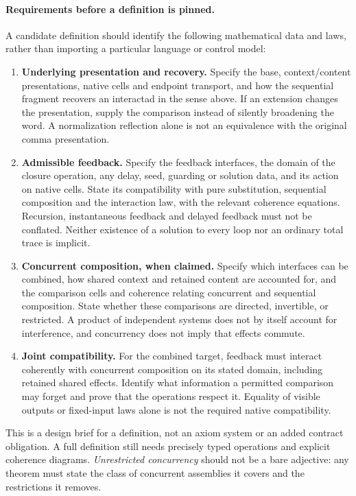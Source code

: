 \documentclass[11pt]{article}
\begin{document}
\paragraph{Requirements before a definition is pinned.}
A candidate definition should identify the following mathematical data
and laws, rather than importing a particular language or control model:
\begin{enumerate}
\item \textbf{Underlying presentation and recovery.} Specify the base,
context/content presentations, native cells and endpoint transport, and
how the sequential fragment recovers an interactad in the sense above.
If an extension changes the presentation, supply the comparison instead
of silently broadening the word. A normalization reflection alone is not
an equivalence with the original comma presentation.
\item \textbf{Admissible feedback.} Specify the feedback interfaces,
the domain of the closure operation, any delay, seed, guarding or
solution data, and its action on native cells. State its compatibility
with pure substitution, sequential composition and the interaction law,
with the relevant coherence equations. Recursion, instantaneous feedback
and delayed feedback must not be conflated. Neither existence of a
solution to every loop nor an ordinary total trace is implicit.
\item \textbf{Concurrent composition, when claimed.} Specify which
interfaces can be combined, how shared context and retained content are
accounted for, and the comparison cells and coherence relating concurrent
and sequential composition. State whether these comparisons are directed,
invertible, or restricted. A product of independent systems does not by
itself account for interference, and concurrency does not imply that
effects commute.
\item \textbf{Joint compatibility.} For the combined target, feedback
must interact coherently with concurrent composition on its stated domain,
including retained shared effects. Identify what information a permitted
comparison may forget and prove that the operations respect it. Equality
of visible outputs or fixed-input laws alone is not the required native
compatibility.
\end{enumerate}
This is a design brief for a definition, not an axiom system or an added
contract obligation. A full definition still needs precisely typed
operations and explicit coherence diagrams. \emph{Unrestricted concurrency}
should not be a bare adjective: any theorem must state the class of
concurrent assemblies it covers and the restrictions it removes.
\end{document}

